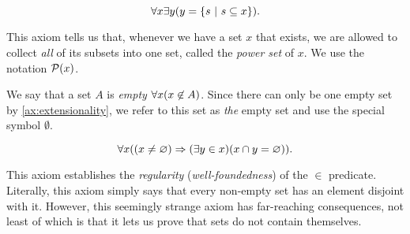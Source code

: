 
\begin{axiom}
    \vspace{-\abovedisplayskip}
    \[
        \forall x \exists y \pn*{y = \set*{s \suchthat s \subseteq x}}.
    \]

    This axiom tells us that, whenever we have a set \(x\) that exists,
    we are allowed to collect \emph{all} of its subsets into one set, called the \emph{power set} of \(x\).
    We use the notation \(\power{x}\).
\end{axiom}

\begin{definition}
    We say that a set \(A\) is \emph{empty} \iffbydefn \(\forall x \pn*{x \not \in A}\).
    Since there can only be one empty set by \autoref{ax:extensionality},
    we refer to this set as \emph{the} empty set and use the special symbol \(\emptyset\).
\end{definition}

\begin{axiom}[Regularity]\label{ax:regularity}
    \vspace{-\abovedisplayskip}
    \[
        \forall x \pn*{\pn*{x \neq \emptyset} \implies \pn*{\exists y \in x}\pn*{x \intersect y = \emptyset}}.
    \]

    This axiom establishes the \emph{regularity} (\aka \emph{well-foundedness}) of the \(\in\) predicate.
    Literally, this axiom simply says that every non-empty set has an element disjoint with it.
    However, this seemingly strange axiom has far-reaching consequences,
    not least of which is that it lets us prove that sets do not contain themselves.
\end{axiom}

